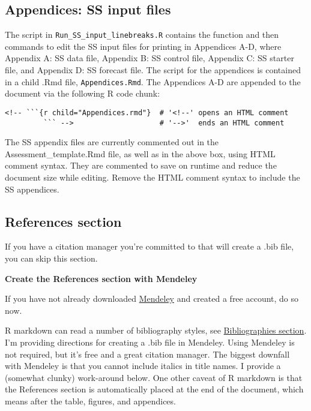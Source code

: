 \documentclass[12pt,]{article}
\begin{document}
\subsection{Appendices: SS input files}\label{appendices-ss-input-files}

The script in \texttt{Run\_SS\_input\_linebreaks.R} contains the
function and then commands to edit the SS input files for printing in
Appendices A-D, where Appendix A: SS data file, Appendix B: SS control
file, Appendix C: SS starter file, and Appendix D: SS forecast file. The
script for the appendices is contained in a child .Rmd file,
\texttt{Appendices.Rmd}. The Appendices A-D are appended to the document
via the following R code chunk:

\begin{Verbatim}[frame=single]
<!-- ```{r child="Appendices.rmd"}  # '<!--' opens an HTML comment
         ``` -->                    # '-->'  ends an HTML comment
\end{Verbatim}

The SS appendix files are currently commented out in the
Assessment\_template.Rmd file, as well as in the above box, using HTML
comment syntax. They are commented to save on runtime and reduce the
document size while editing. Remove the HTML comment syntax to include
the SS appendices.

\subsection{References section}\label{references-section}

If you have a citation manager you're committed to that will create a
.bib file, you can skip this section.

\textbf{Create the References section with Mendeley}

If you have not already downloaded
\href{https://www.mendeley.com/}{Mendeley} and created a free account,
do so now.

R markdown can read a number of bibliography styles, see
\href{http://rmarkdown.rstudio.com/authoring_bibliographies_and_citations.html}{Bibliographies
section}. I'm providing directions for creating a .bib file in Mendeley.
Using Mendeley is not required, but it's free and a great citation
manager. The biggest downfall with Mendeley is that you cannot include
italics in title names. I provide a (somewhat clunky) work-around below.
One other caveat of R markdown is that the References section is
automatically placed at the end of the document, which means after the
table, figures, and appendices.
\end{document}
